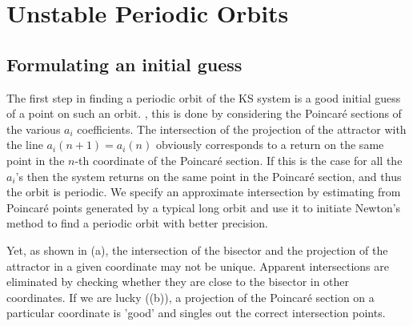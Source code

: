 \documentclass[pre,preprint,groupedaddress,showpacs,showkeys]{revtex4}
\begin{document}



\section{Unstable Periodic Orbits}

 \subsection{Formulating an initial guess}

  The first step in finding a periodic orbit of the KS system is
  a good initial guess of a point on such an
  orbit. , this is done by considering the Poincar\'e sections of the various
  $a_i$ coefficients. The intersection of the projection of the attractor with
  the line $a_i(n+1)=a_i(n)$ obviously corresponds to a return on the same point
  in the $n$-th coordinate of the Poincar\'e section. If this is the case for all the $a_i$'s then the
  system returns on the same point in the Poincar\'e section, and thus the orbit is
  periodic. We specify an approximate intersection by estimating from Poincar\'e points
  generated by a typical long orbit and use it to initiate Newton's method to find a
  periodic orbit with better precision.

  Yet, as shown in (a), the intersection of the bisector and
  the projection of the attractor in a given coordinate may not be unique.
  Apparent intersections are eliminated by checking whether they are close to the
  bisector in other coordinates. If we are lucky ((b)), a projection of the
  Poincar\'e section on a particular coordinate is 'good' and singles out the correct intersection
  points.
\end{document}
